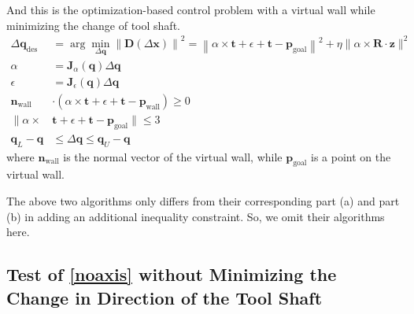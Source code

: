 \documentclass[english,10pt,a4paper]{book}
\begin{document}
		And this is the optimization-based control problem with a virtual wall while minimizing the change of tool shaft.
		\begin{equation}\label{withaxis}
			\begin{aligned}
				\Delta \mathbf{q}_{\text{des}} &= \arg \min_{\Delta \mathbf{q}} \left\| \mathbf{D}(\Delta \mathbf{x}) \right\|^2 = \left\| \alpha \times \mathbf{t} + \epsilon + \mathbf{t} - \mathbf{p}_{\text{goal}} \right\|^2 + \eta \|\alpha \times \mathbf{R} \cdot \mathbf{z}\|^2\\
				\alpha &= \mathbf{J}_{\alpha}(\mathbf{q}) \Delta \mathbf{q} \\
				\epsilon &= \mathbf{J}_{\epsilon}(\mathbf{q}) \Delta \mathbf{q} \\
				\mathbf{n}_{\text{wall}} & \cdot( \alpha \times \mathbf{t} + \epsilon + \mathbf{t} - \mathbf{p}_{\text{wall}}) \ge 0 \\
				\| \alpha \times &\mathbf{t} + \epsilon + \mathbf{t} - \mathbf{p}_{\text{goal}} \| \leq 3 \\
				\mathbf{q}_L - \mathbf{q} &\leq \Delta \mathbf{q} \leq \mathbf{q}_U - \mathbf{q}
			\end{aligned}
		\end{equation}
		where \(\mathbf{n}_{\text{wall}}\) is the normal vector of the virtual wall, while \(\mathbf{p}_{\text{goal}}\) is a point on the virtual wall.
		
		The above two algorithms only differs from their corresponding part (a) and part (b) in adding an additional inequality constraint. So, we omit their algorithms here.
		\subsection{Test of \ref{noaxis} without Minimizing the Change in Direction of the Tool Shaft}
\end{document}
